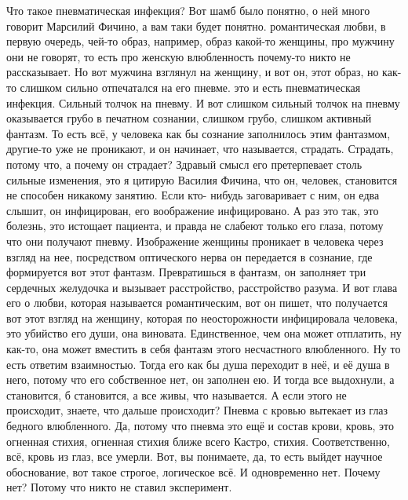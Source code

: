 Что такое пневматическая инфекция? Вот шамб было понятно, о ней
много говорит Марсилий Фичино, а вам таки будет понятно. романтическая любви, в
первую очередь, чей-то образ, например, образ какой-то женщины, про мужчину они
не говорят, то есть про женскую влюбленность почему-то никто не рассказывает. Но
вот мужчина взглянул на женщину, и вот он, этот образ, но как-то слишком сильно
отпечатался на его пневме. это и есть пневматическая инфекция. Сильный толчок на
пневму. И вот слишком сильный толчок на пневму оказывается грубо в печатном
сознании, слишком грубо, слишком активный фантазм. То есть всё, у человека как
бы сознание заполнилось этим фантазмом, другие-то уже не проникают, и он
начинает, что называется, страдать. Страдать, потому что, а почему он страдает?
Здравый смысл его претерпевает столь сильные изменения, это я цитирую Василия
Фичина, что он, человек, становится не способен никакому занятию. Если кто-
нибудь заговаривает с ним, он едва слышит, он инфицирован, его воображение
инфицировано. А раз это так, это болезнь, это истощает пациента, и правда не
слабеют только его глаза, потому что они получают пневму. Изображение женщины
проникает в человека через взгляд на нее, посредством оптического нерва он
передается в сознание, где формируется вот этот фантазм. Превратишься в фантазм,
он заполняет три сердечных желудочка и вызывает расстройство, расстройство
разума. И вот глава его о любви, которая называется романтическим, вот он пишет,
что получается вот этот взгляд на женщину, которая по неосторожности
инфицировала человека, это убийство его души, она виновата. Единственное, чем
она может отплатить, ну как-то, она может вместить в себя фантазм этого
несчастного влюбленного. Ну то есть ответим взаимностью. Тогда его как бы душа
переходит в неё, и её душа в него, потому что его собственное нет, он заполнен
ею. И тогда все выдохнули, а становится, б становится, а все живы, что
называется. А если этого не происходит, знаете, что дальше происходит? Пневма с
кровью вытекает из глаз бедного влюбленного. Да, потому что пневма это ещё и
состав крови, кровь, это огненная стихия, огненная стихия ближе всего Кастро,
стихия. Соответственно, всё, кровь из глаз, все умерли. Вот, вы понимаете, да,
то есть выйдет научное обоснование, вот такое строгое, логическое всё. И
одновременно нет. Почему нет? Потому что никто не ставил эксперимент.


